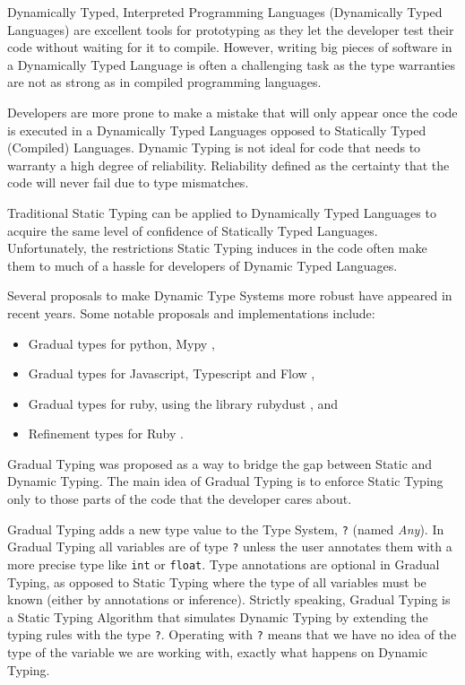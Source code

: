 Dynamically Typed, Interpreted Programming Languages (Dynamically Typed
Languages) are excellent tools for prototyping as they let the developer
test their code without waiting for it to compile. However, writing big
pieces of software in a Dynamically Typed Language is often a
challenging task as the type warranties are not as strong as in compiled
programming languages.

Developers are more prone to make a mistake that will only appear once
the code is executed in a Dynamically Typed Languages opposed to
Statically Typed (Compiled) Languages. Dynamic Typing is not ideal for
code that needs to warranty a high degree of reliability. Reliability
defined as the certainty that the code will never fail due to type
mismatches.

Traditional Static Typing can be applied to Dynamically Typed Languages
to acquire the same level of confidence of Statically Typed Languages.
Unfortunately, the restrictions Static Typing induces in the code often
make them to much of a hassle for developers of Dynamic Typed Languages.

Several proposals to make Dynamic Type Systems more robust have appeared
in recent years. Some notable proposals and implementations include:

\begin{itemize}
\tightlist
\item
  Gradual types for python, Mypy \autocite{lehtosalo2016mypy},
\item
  Gradual types for Javascript, Typescript
  \autocites{bierman2014understanding}{hejlsberg2012introducing} and
  Flow \autocite{chaudhuri2016flow},
\item
  Gradual types for ruby, using the library rubydust
  \autocite{an_dynamic_2011}, and
\item
  Refinement types for Ruby \autocite{kazerounian_refinement_2017}.
\end{itemize}

Gradual Typing \autocite{siek_gradual_2006} was proposed as a way to
bridge the gap between Static and Dynamic Typing. The main idea of
Gradual Typing is to enforce Static Typing only to those parts of the
code that the developer cares about.

Gradual Typing adds a new type value to the Type System, \texttt{?}
(named \emph{Any}). In Gradual Typing all variables are of type
\texttt{?} unless the user annotates them with a more precise type like
\texttt{int} or \texttt{float}. Type annotations are optional in Gradual
Typing, as opposed to Static Typing where the type of all variables must
be known (either by annotations or inference). Strictly speaking,
Gradual Typing is a Static Typing Algorithm that simulates Dynamic
Typing by extending the typing rules with the type \texttt{?}. Operating
with \texttt{?} means that we have no idea of the type of the variable
we are working with, exactly what happens on Dynamic Typing.

